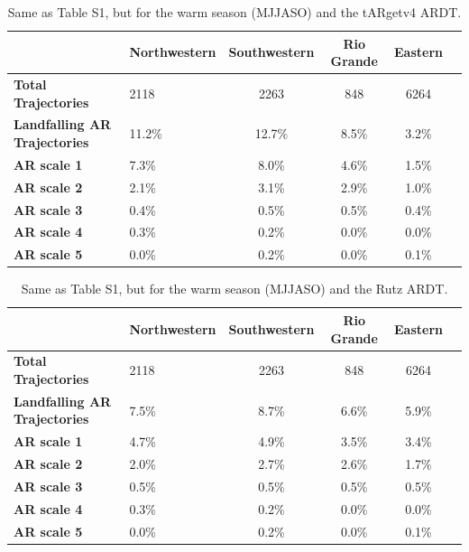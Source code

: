 \documentclass[jgrga]{agutexSI2019}
\begin{document}
\begin{article}
\begin{table}
\caption{Same as Table S1, but for the warm season (MJJASO) and the tARgetv4 ARDT.}
\label{table:MJJASOtARget}
\begin{tabular}{lp{2cm}cccc}
\toprule
 & Northwestern & Southwestern & Rio Grande & Eastern \\
\midrule
\textbf{Total Trajectories} & 2118 & 2263 & 848 & 6264 \\
\textbf{Landfalling AR Trajectories} & 11.2\% & 12.7\% & 8.5\% & 3.2\% \\
\textbf{AR scale 1} & 7.3\% & 8.0\% & 4.6\% & 1.5\% \\
\textbf{AR scale 2} & 2.1\% & 3.1\% & 2.9\% & 1.0\% \\
\textbf{AR scale 3} & 0.4\% & 0.5\% & 0.5\% & 0.4\% \\
\textbf{AR scale 4} & 0.3\% & 0.2\% & 0.0\% & 0.0\% \\
\textbf{AR scale 5} & 0.0\% & 0.2\% & 0.0\% & 0.1\% \\
\bottomrule
\end{tabular}
\end{table}

\begin{table}
\caption{Same as Table S1, but for the warm season (MJJASO) and the Rutz ARDT.}
\label{table:MJJASOar}
\begin{tabular}{lp{2cm}cccc}
\toprule
 & Northwestern & Southwestern & Rio Grande & Eastern \\
\midrule
\textbf{Total Trajectories} & 2118 & 2263 & 848 & 6264 \\
\textbf{Landfalling AR Trajectories} & 7.5\% & 8.7\% & 6.6\% & 5.9\% \\
\textbf{AR scale 1} & 4.7\% & 4.9\% & 3.5\% & 3.4\% \\
\textbf{AR scale 2} & 2.0\% & 2.7\% & 2.6\% & 1.7\% \\
\textbf{AR scale 3} & 0.5\% & 0.5\% & 0.5\% & 0.5\% \\
\textbf{AR scale 4} & 0.3\% & 0.2\% & 0.0\% & 0.0\% \\
\textbf{AR scale 5} & 0.0\% & 0.2\% & 0.0\% & 0.1\% \\
\bottomrule
\end{tabular}
\end{table}


\end{article}
\end{document}
